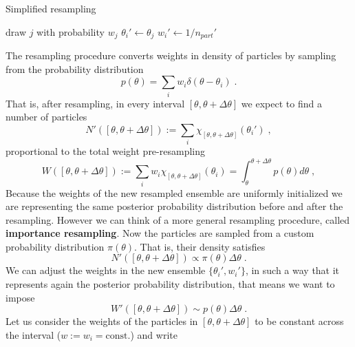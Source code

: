 \documentclass[aps, pra, 10pt, twocolumn, superscriptaddress,floatfix]{revtex4-1}
\begin{document}
%
\begin{algorithm}[H]
	\caption{Simplified resampling}
	\label{alg:resamplingSimplified}
	\begin{algorithmic}[1]
		\State draw $j$ with probability $w_j$
		\State $\theta_i' \gets \theta_j$
		\State $w_i' \gets 1/n_{part}'$
		\EndFor
		\EndFunction
	\end{algorithmic}
\end{algorithm}
%
The resampling procedure converts weights in density of particles by sampling from the probability distribution
%
\begin{equation}
	p(\theta) = \sum_i w_i \delta(\theta-\theta_i) \; .
\end{equation}
%
That is, after resampling, in every interval $[\theta, \theta + \Delta \theta]$ we expect to find a number of particles 
%
\begin{equation}
	N'([\theta, \theta + \Delta \theta]) := \sum_i \chi_{[\theta, \theta + \Delta \theta]} (\theta_i') \; ,
\end{equation}
%
proportional to the total weight pre-resampling
%
\begin{equation}
	W([\theta, \theta + \Delta \theta]) := \sum_{i} w_i \chi_{[\theta, \theta + \Delta \theta]} (\theta_i) = \int_{\theta}^{\theta + \Delta \theta} p(\theta) d \theta \; ,
\end{equation}
%
Because the weights of the new resampled ensemble are uniformly initialized we are representing the same posterior probability distribution before and after the resampling. However we can think of a more general resampling procedure, called \textbf{importance resampling}. Now the particles are sampled from a custom probability distribution $\pi (\theta)$. That is, their density satisfies
%
\begin{equation}
	N'([\theta, \theta + \Delta \theta]) \propto \pi(\theta) \Delta \theta \; .
\end{equation}
%
We can adjust the weights in the new ensemble $\lbrace \theta_i', w_i' \rbrace$, in such a way that it represents again the posterior probability distribution, that means we want to impose
%
\begin{equation}
	W'([\theta, \theta + \Delta \theta]) \sim p(\theta) \Delta \theta \; .
\end{equation}
%
Let us consider the weights of the particles in $[\theta, \theta+\Delta \theta]$ to be constant across the interval ($w := w_i = \text{const.}$) and write
\end{document}
